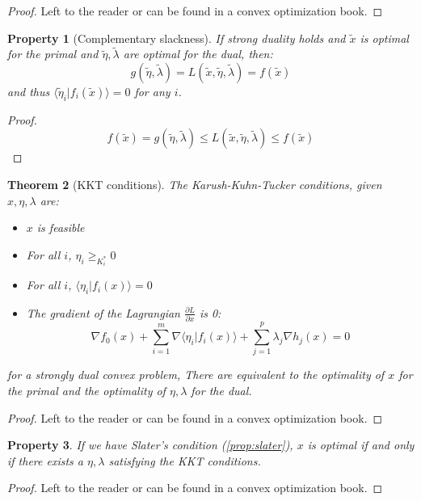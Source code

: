 \documentclass[10pt,a4paper]{report}
\theoremstyle{plain}
\newtheorem{thm}{Theorem}[chapter]
\newtheorem{prop}[thm]{Property}
\theoremstyle{definition}
\theoremstyle{remark}
\newcommand{\TODO}{\textbf{TODO}}
\newcommand{\braket}[2]{\langle#1|#2\rangle}
\newcommand{\dpar}[2]{\frac{\partial{#1}}{\partial{#2}}}
\renewcommand{\geq}{\geqslant}
\renewcommand{\leq}{\leqslant}
\begin{document}
\begin{proof}
  Left to the reader or can be found in a convex optimization book.
\end{proof}

\begin{prop}[Complementary slackness]
  If strong duality holds and $\tilde x$ is optimal for the primal and
  $\tilde \eta, \tilde{\lambda}$ are optimal for the dual, then:
  \[g(\tilde \eta, \tilde{\lambda}) = L(\tilde x, \tilde{\eta},\tilde{\lambda}) = f(\tilde{x})\]
  and thus $\braket {\tilde\eta_i}{f_i(\tilde{x})} = 0$ for any $i$.
\end{prop}

\begin{proof}
  \[ f(\tilde x) = g(\tilde \eta, \tilde{\lambda}) \leq
    L(\tilde x, \tilde{\eta},\tilde{\lambda}) \leq f(\tilde{x})\]
\end{proof}

\begin{thm}[KKT conditions]\label{thm:KKT}
  The Karush-Kuhn-Tucker conditions, given $x,\eta,\lambda$ are:
  \begin{itemize}
  \item $x$ is feasible
  \item For all $i$, $\eta_i \geq_{K_i^*}0$
  \item For all $i$, $\braket {\eta_i}{f_i({x})} = 0$
  \item The gradient of the Lagrangian $\dpar L x$ is 0:
    \[ \nabla f_0(x) + \sum_{i = 1}^m \nabla\braket{\eta_i}{f_i(x)} +
      \sum_{j=1}^p \lambda_j \nabla h_j(x) = 0\]
  \end{itemize}
  for a strongly dual convex problem, There are equivalent to the optimality of
  $x$ for the primal and the optimality of $\eta,\lambda$ for the dual.

\end{thm}

\begin{proof}
  Left to the reader or can be found in a convex optimization book.
\end{proof}

\begin{prop}\label{prop:slaterKKT}
  If we have Slater's condition (\ref{prop:slater}), $x$ is optimal if and only if there exists a
  $\eta,\lambda$ satisfying the KKT conditions.
\end{prop}

\begin{proof}
  Left to the reader or can be found in a convex optimization book.
\end{proof}
\end{document}

